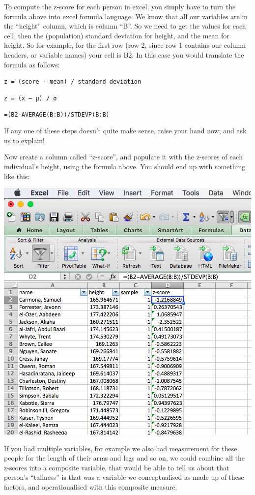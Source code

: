 \documentclass[]{book}
\theoremstyle{definition}
\theoremstyle{definition}
\theoremstyle{definition}
\theoremstyle{remark}
\begin{document}
To compute the z-score for each person in excel, you simply have to turn
the formula above into excel formula language. We know that all our
variables are in the ``height'' column, which is column ``B''. So we
need to get the values for each cell, then the (population) standard
deviation for height, and the mean for height. So for example, for the
first row (row 2, since row 1 contains our column headers, or variable
names) your cell is B2. In this case you would translate the formula as
follows:

\texttt{z\ =\ (score\ -\ mean)\ /\ standard\ deviation}

\texttt{z\ =\ (x\ –\ μ)\ /\ σ}

\texttt{=(B2-AVERAGE(B:B))/STDEVP(B:B)}

If any one of these steps doesn't quite make sense, raise your hand now,
and ask us to explain!

Now create a column called ``z-score'', and populate it with the
z-scores of each individual's height, using the formula above. You
should end up with something like this:

\includegraphics{imgs/z-score-col.png}

If you had multiple variables, for example we also had measurement for
these people for the length of their arms and legs and so on, we could
combine all the z-scores into a composite variable, that would be able
to tell us about that person's ``tallness'' is that was a variable we
conceptualised as made up of these factors, and operationalised with
this composite measure.
\end{document}
